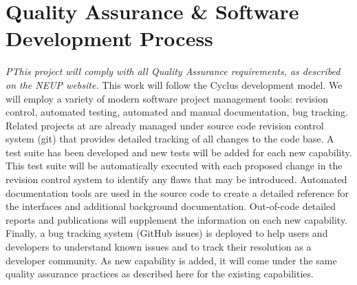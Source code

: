 \documentclass[dvips,12pt]{article}
\begin{document}
\section{Quality Assurance \& Software Development Process}

\textit{PThis project will comply with all Quality
  Assurance requirements, as described on the NEUP
  website.}  
This work will follow the Cyclus development
model.  We will employ a variety of modern
software project management tools: revision
control, automated testing, automated and manual
documentation, bug tracking. Related projects at
are already managed under source code revision
control system (git) that provides detailed
tracking of all changes to the code base. A test
suite has been developed and new tests will be
added for each new capability. This test suite
will be automatically executed with each proposed
change in the revision control system to identify
any flaws that may be introduced. Automated
documentation tools are used in the source code to
create a detailed reference for the interfaces and
additional background documentation. Out-of-code
detailed reports and publications will supplement
the information on each new capability. Finally, a
bug tracking system (GitHub issues) is deployed to
help users and developers to understand known
issues and to track their resolution as a
developer community. As new capability is added,
it will come under the same quality assurance
practices as described here for the existing
capabilities.







\label{LastPage}
\end{document}
